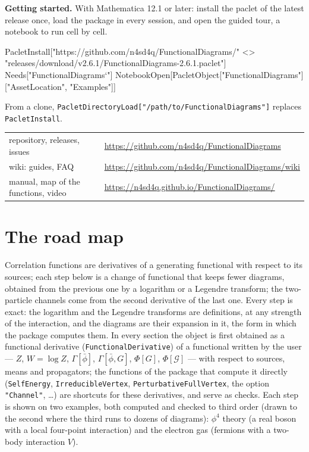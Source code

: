 \documentclass[11pt,a4paper]{article}
\newcommand{\pkg}[1]{\texttt{#1}}
\begin{document}
\begin{keypoint}
\raggedright\textbf{Getting started.} With Mathematica 12.1 or later: install the paclet of the latest release once,
load the package in every session, and open the guided tour, a notebook to run cell by cell.
\begin{code}
PacletInstall["https://github.com/n4sd4q/FunctionalDiagrams/" <>
  "releases/download/v2.6.1/FunctionalDiagrams-2.6.1.paclet"]
Needs["FunctionalDiagrams`"]
NotebookOpen[PacletObject["FunctionalDiagrams"]["AssetLocation", "Examples"]]
\end{code}
From a clone, \pkg{PacletDirectoryLoad["/path/to/FunctionalDiagrams"]} replaces \pkg{PacletInstall}.\par\medskip
\begin{tabular}{@{}l@{\qquad}l@{}}
repository, releases, issues & \url{https://github.com/n4sd4q/FunctionalDiagrams}\\
wiki: guides, FAQ & \url{https://github.com/n4sd4q/FunctionalDiagrams/wiki}\\
manual, map of the functions, video & \url{https://n4sd4q.github.io/FunctionalDiagrams/}
\end{tabular}
\end{keypoint}


\section*{The road map}

Correlation functions are derivatives of a generating functional with respect to its sources; each step below is a change
of functional that keeps fewer diagrams, obtained from the previous one by a logarithm or a Legendre transform; the
two-particle channels come from the second derivative of the last one. Every step is exact: the logarithm and the
Legendre transforms are definitions, at any strength of the interaction, and the diagrams are their expansion in it, the
form in which the package computes them. In every section the object is first obtained as a functional derivative
(\pkg{FunctionalDerivative}) of a functional written by the user --- $Z$, $W=\log Z$, $\Gamma[\bar\phi]$,
$\Gamma[\bar\phi,G]$, $\Phi[G]$, $\Phi[\mathcal G]$ --- with respect to sources, means and propagators; the functions
of the package that compute it directly (\pkg{SelfEnergy}, \pkg{IrreducibleVertex}, \pkg{PerturbativeFullVertex},
the option \pkg{"Channel"}, \dots) are shortcuts for these derivatives, and serve as checks. Each step is shown on two
examples, both computed and checked to third order (drawn to the second where the third runs to dozens of diagrams):
$\phi^4$ theory (a real boson with a local four-point interaction) and the electron gas (fermions with a two-body
interaction $V$).
\end{document}
